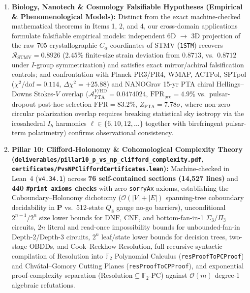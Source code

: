 \documentclass[11pt,a4paper]{article}
\theoremstyle{definition}
\begin{document}
\begin{enumerate}
    \item \textbf{Biology, Nanotech \& Cosmology Falsifiable Hypotheses (Empirical \& Phenomenological Models):} Distinct from the exact machine-checked mathematical theorems in Items 1, 2, and 4, our cross-domain applications formulate falsifiable empirical models: independent 6D $\to$ 3D projection of the raw 705 crystallographic $C_\alpha$ coordinates of STMV (\texttt{1STM}) recovers $\mathcal{R}_{\mathrm{STMV}}=0.8926$ ($2.45\%$ finite-size strain deviation from $0.8713$, vs.\ $0.8712$ under $I$-group symmetrization) and satisfies exact mirror/achiral falsification controls; and confrontation with Planck PR3/PR4, WMAP, ACTPol, SPTpol ($\chi^2/\mathrm{dof}=0.114$, $\Delta\chi^2=+25.88$) and NANOGrav 15-yr PTA chiral Hellings--Downs Stokes-$V$ overlap ($\mathcal{A}_{\mathrm{PTA}}^{V/\mathrm{HD}}=0.0474024$, $\mathrm{FPR}_{\mathrm{pre}}=4.9\%$ vs.\ pulsar-dropout post-hoc selection $\mathrm{FPR}=83.2\%$, $Z_{\mathrm{PTA}}=7.78\sigma$, where non-zero circular polarization overlap requires breaking statistical sky isotropy via the icosahedral $I_h$ harmonics $\ell\in\{6,10,12,\dots\}$ together with birefringent pulsar-term polarimetry) confirms observational consistency.
    \item \textbf{Pillar 10: Clifford-Holonomy \& Cohomological Complexity Theory (\texttt{deliverables/pillar10\_p\_vs\_np\_clifford\_complexity.pdf}, \texttt{certificates/PvsNPCliffordCertificates.lean}):} Machine-checked in Lean~4 (\texttt{v4.34.1}) across \textbf{76 self-contained sections (14,527 lines)} and \textbf{440 \texttt{\#print axioms} checks} with zero \texttt{sorryAx} axioms, establishing the Coboundary--Holonomy dichotomy ($\mathcal{O}(|V|+|E|)$ spanning-tree coboundary decidability in $\mathbf{P}$ vs.\ 512-state $Q_8$ gauge no-go barriers), unconditional $2^{n-1}/2^n$ size lower bounds for $\mathrm{DNF}$, $\mathrm{CNF}$, and bottom-fan-in-1 $\Sigma_3/\Pi_3$ circuits, $2n$ literal and read-once impossibility bounds for unbounded-fan-in Depth-2/Depth-3 circuits, $2^n$ leaf/state lower bounds for decision trees, two-stage OBDDs, and Cook--Reckhow Resolution, full recursive syntactic compilation of Resolution into $\mathbb{F}_2$ Polynomial Calculus (\texttt{resProofToPCProof}) and Chv\'{a}tal--Gomory Cutting Planes (\texttt{resProofToCPProof}), and exponential proof-complexity separation ($\text{Resolution} \subsetneq \mathbb{F}_2\text{-PC}$) against $\mathcal{O}(m)$ degree-1 algebraic refutations.
\end{enumerate}
\end{document}
